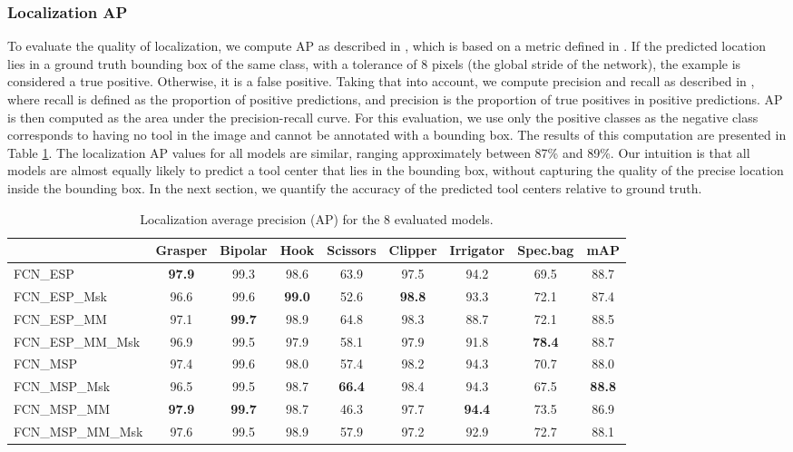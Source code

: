 \documentclass[english,runningheads,a4paper]{llncs}
\begin{document}
\subsubsection{Localization AP}
To evaluate the quality of localization, we compute AP as described in \cite{hwang:miccai16}, which is based on a metric defined in \cite{oquab:cvpr15}. 
If the predicted location lies in a ground truth bounding box of the same class, with a tolerance of 8 pixels (the global stride of the network), the example is considered a true positive. Otherwise, it is a false positive. Taking that into account, we compute precision and recall as described in \cite{everingham:ijcv10}, where recall is defined as the proportion of positive predictions, and precision is the proportion of true positives in positive predictions. AP is then computed as the area under the precision-recall curve. For this evaluation, we use only the positive classes as the negative class corresponds to having no tool in the image and cannot be annotated with a bounding box.
The results of this computation are presented in Table \ref{tab:loc_ap}. The localization AP values for all models are similar, ranging approximately between 87\% and 89\%. Our intuition is that all models are almost equally likely to predict a tool center that lies in the bounding box, without capturing the quality of the precise location inside the bounding box. In the next section, we quantify the accuracy of the predicted tool centers relative to ground truth.
\begin{table}[t]
\centering
\begin{tabular}{|l|c|c|c|c|c|c|c|c|}
\hline
             & Grasper & Bipolar & Hook & Scissors & Clipper & Irrigator & Spec.bag & \textbf{mAP} \\ \hline
FCN\_ESP & \textbf{97.9}  & 99.3 & 98.6 & 63.9 & 97.5 & 94.2 & 69.5 & 88.7 \\ \hline
FCN\_ESP\_Msk & 96.6  & 99.6 & \textbf{99.0} & 52.6 & \textbf{98.8} & 93.3 & 72.1 & 87.4 \\ \hline
FCN\_ESP\_MM & 97.1  & \textbf{99.7} & 98.9 & 64.8 & 98.3 & 88.7 & 72.1 & 88.5 \\ \hline
FCN\_ESP\_MM\_Msk   & 96.9  & 99.5 & 97.9 & 58.1 & 97.9 & 91.8 & \textbf{78.4} & 88.7 \\ \hline
FCN\_MSP     & 97.4 & 99.6 & 98.0 & 57.4 & 98.2 & 94.3 & 70.7 & 88.0 \\ \hline
FCN\_MSP\_Msk & 96.5 & 99.5 & 98.7 & \textbf{66.4} & 98.4 & 94.3 & 67.5 & \textbf{88.8} \\ \hline
FCN\_MSP\_MM & \textbf{97.9} & \textbf{99.7} & 98.7 & 46.3 & 97.7 & \textbf{94.4} & 73.5 & 86.9 \\ \hline
FCN\_MSP\_MM\_Msk & 97.6 & 99.5 & 98.9 & 57.9 & 97.2 & 92.9 & 72.7 & 88.1 \\ \hline
\end{tabular}
\smallskip
\caption{Localization average precision (AP) for the 8 evaluated models.}
\label{tab:loc_ap}
\end{table}
\end{document}
